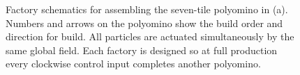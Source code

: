 




\begin{figure}\label{TS}
\centering
{}\par
{}\par        
{}
\caption{Factory schematics for assembling the seven-tile polyomino in (a).  Numbers and arrows on the polyomino show the build order and direction for build. All particles are actuated simultaneously by the same global field. Each factory is designed so at full production every clockwise control input completes another polyomino.}
\end{figure}





